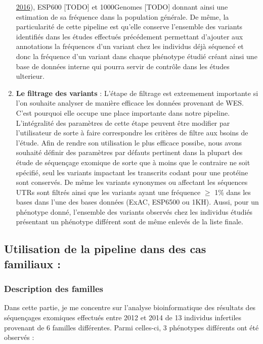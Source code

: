 \documentclass[12pt,twoside]{reedthesis}
\theoremstyle{definition}
\theoremstyle{definition}
\theoremstyle{remark}
\begin{document}
\begin{enumerate}
    \protect\hyperlink{ref-Lek2016}{2016}), ESP600 {[}TODO{]} et
    1000Genomes {[}TODO{]} donnant ainsi une estimation de sa fréquence
    dans la population générale. De même, la particularité de cette
    pipeline est qu'elle conserve l'ensemble des variants identifiés dans
    les études effectués précédement permettant d'ajouter aux annotations
    la fréquences d'un variant chez les individus déjà séquencé et donc la
    fréquence d'un variant dans chaque phénotype étudié créant ainsi une
    base de données interne qui pourra servir de contrôle dans les études
    ulterieur.
  \item
    \textbf{Le filtrage des variants} : L'étape de filtrage est
    extremement importante si l'on souhaite analyser de manière efficace
    les données provenant de WES. C'est pourquoi elle occupe une place
    importante dans notre pipeline. L'intégralité des paramètres de cette
    étape peuvent être modifier par l'utilisateur de sorte à faire
    correspondre les critères de filtre aux bsoins de l'étude. Afin de
    rendre son utilisation le plus efficace possibe, nous avons souhaité
    définir des paramètres par défauts pertinent dans la plupart des étude
    de séquençage exomique de sorte que à moins que le contraire ne soit
    spécifié, seul les variants impactant les transcrits codant pour une
    protéine sont conservés. De même les variants synonymes ou affectant
    les séquences UTRs sont filtrés ainsi que les variants ayant une
    fréquence \(\ge\) 1\% dans les bases dans l'une des bases données
    (ExAC, ESP6500 ou 1KH). Aussi, pour un phénotype donné, l'ensemble des
    variants observés chez les individus étudiés présentant un phénotype
    différent sont de même enlevés de la liste finale.
  \end{enumerate}
  
  \subsection{Utilisation de la pipeline dans des cas familiaux
  :}\label{utilisation-de-la-pipeline-dans-des-cas-familiaux}
  
  \subsubsection{Description des familles}\label{description-des-familles}
  
  Dans cette partie, je me concentre sur l'analyse bioinformatique des
  résultats des séquençages exomiques effectués entre 2012 et 2014 de 13
  individus infertiles provenant de 6 familles différentes. Parmi
  celles-ci, 3 phénotypes différents ont été observés :
  
\end{document}
